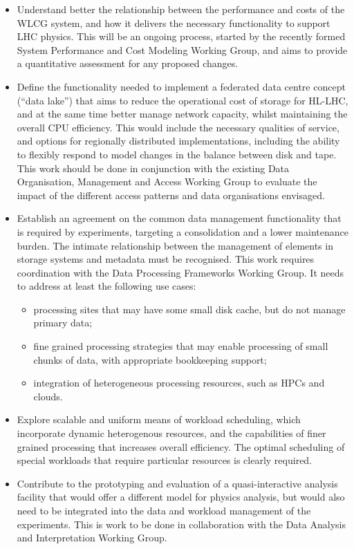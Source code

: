 \documentclass[twocolumn]{svjour3}          %
\begin{document}
\begin{itemize}
\item
  Understand better the relationship between the performance and costs
  of the WLCG system, and how it delivers the necessary functionality to
  support LHC physics. This will be an ongoing process, started by the
  recently formed System Performance and Cost Modeling Working Group,
  and aims to provide a quantitative assessment for any proposed
  changes.
\item
  Define the functionality needed to implement a federated data centre
  concept (``data lake'') that aims to reduce the operational cost of
  storage for HL-LHC, and at the same time better manage network
  capacity, whilst maintaining the overall CPU efficiency. This would
  include the necessary qualities of service, and options for regionally
  distributed implementations, including the ability to flexibly respond
  to model changes in the balance between disk and tape. This work
  should be done in conjunction with the existing Data Organisation,
  Management and Access Working Group to evaluate the impact of the
  different access patterns and data organisations envisaged.
\item
  Establish an agreement on the common data management functionality
  that is required by experiments, targeting a consolidation and a lower
  maintenance burden. The intimate relationship between the management
  of elements in storage systems and metadata must be recognised. This
  work requires coordination with the Data Processing Frameworks
  Working Group. It
  needs to address at least the following use cases:

  \begin{itemize}
  \item
    processing sites that may have some small disk cache, but do not
    manage primary data;
  \item
    fine grained processing strategies that may enable processing of
    small chunks of data, with appropriate bookkeeping support;
  \item
    integration of heterogeneous processing resources, such as HPCs and
    clou\-ds.
  \end{itemize}
\item
  Explore scalable and uniform means of workload scheduling, which
  incorporate dynamic heterogenous resources, and the capabilities of
  finer grained processing that increases overall efficiency. The
  optimal scheduling of special workloads that require particular
  resources is clearly required.
\item
  Contribute to the prototyping and evaluation of a quasi-interactive
  analysis facility that would offer a different model for physics
  analysis, but would also need to be integrated into the data and
  workload management of the experiments. This is work to be done in
  collaboration with the Data Analysis and Interpretation Working Group.
\end{itemize}
\end{document}
